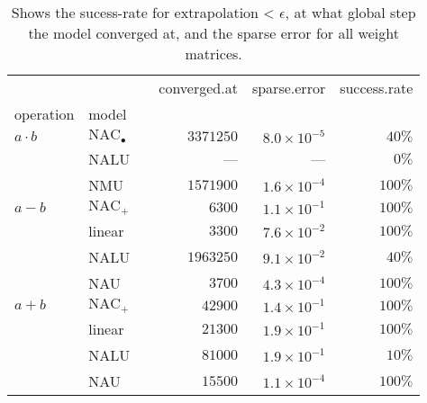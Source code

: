 \begin{table}[H]
\centering
\caption{Shows the sucess-rate for extrapolation < $\epsilon$, at what global step the model converged at, and the sparse error for all weight matrices.} 
\begin{tabular}{lll |rrr}
  \hline
                      &                            & & \multicolumn{1}{l}{          converged.at} & \multicolumn{1}{l}{          sparse.error} & \multicolumn{1}{l}{          success.rate} \\ 
  operation            & model                      &     & \multicolumn{1}{l}{                      } & \multicolumn{1}{l}{                      } & \multicolumn{1}{l}{                      } \\ 
   \hline
  ${a \cdot b}$        & ${\mathrm{NAC}_\bullet}$ &     & $3371250$             & $8.0 \times 10^{-5}$ & $40\%$               \\ 
                       & NALU                       &     & ---                   &      ---              & $0\%$                   \\ 
                       & NMU                        &     & $1571900$             & $1.6 \times 10^{-4}$ & $100\%$              \\ \hline
  $a - b$              & ${\mathrm{NAC}_{+}}$      &     & $6300$                & $1.1 \times 10^{-1}$ & $100\%$              \\ 
                       & linear                     &     & $3300$                & $7.6 \times 10^{-2}$ & $100\%$              \\ 
                       & NALU                       &     & $1963250$             & $9.1 \times 10^{-2}$ & $40\%$               \\ 
                       & NAU                        &     & $3700$                & $4.3 \times 10^{-4}$ & $100\%$              \\ \hline 
  $a + b$              & ${\mathrm{NAC}_{+}}$      &     & $42900$               & $1.4 \times 10^{-1}$ & $100\%$              \\ 
                       & linear                     &     & $21300$               & $1.9 \times 10^{-1}$ & $100\%$              \\ 
                       & NALU                       &     & $81000$               & $1.9 \times 10^{-1}$ & $10\%$               \\ 
                       & NAU                        &     & $15500$               & $1.1 \times 10^{-4}$ & $100\%$              \\ 
   \hline
\end{tabular}
\end{table}
